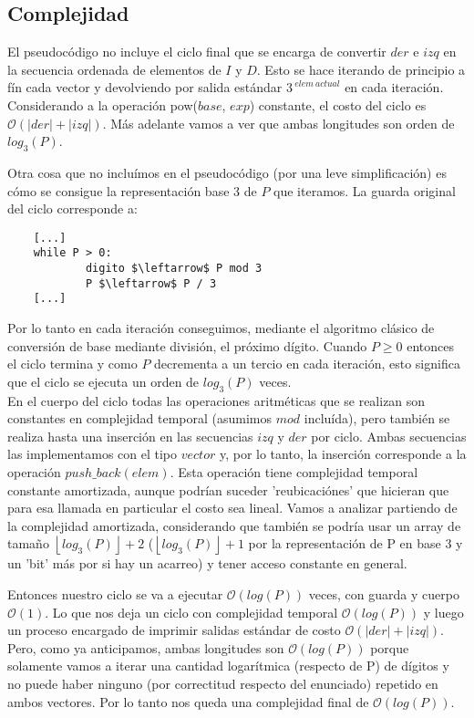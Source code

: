 \newpage
\subsection{Complejidad}
	El pseudocódigo no incluye el ciclo final que se encarga de convertir $der$ e $izq$ en la secuencia ordenada de elementos de $I$ y $D$. Esto se hace iterando de principio a fín cada vector y devolviendo por salida estándar $3^{\ elem \ actual}$ en cada iteración. Considerando a la operación pow($base$, $exp$) constante, el costo del ciclo es $\mathcal{O} (|der| + |izq|)$. Más adelante vamos a ver que ambas longitudes son orden de $log_3(P)$.
	
	Otra cosa que no incluímos en el pseudocódigo (por una leve simplificación) es cómo se consigue la representación base 3 de $P$ que iteramos. La guarda original del ciclo corresponde a:
	
	\begin{lstlisting}
	[...]
	while P > 0:
        	digito $\leftarrow$ P mod 3
        	P $\leftarrow$ P / 3
	[...]
	\end{lstlisting}
	
	Por lo tanto en cada iteración conseguimos, mediante el algoritmo clásico de conversión de base mediante división, el próximo dígito. Cuando $P \geq 0$ entonces el ciclo termina y como $P$ decrementa a un tercio en cada iteración, esto significa que el ciclo se ejecuta un orden de $log_3(P)$ veces. 
	\\
	
	En el cuerpo del ciclo todas las operaciones aritméticas que se realizan son constantes en complejidad temporal (asumimos $mod$ incluída), pero también se realiza hasta una inserción en las secuencias $izq$ y $der$ por ciclo. Ambas secuencias las implementamos con el tipo $vector$ y, por lo tanto, la inserción corresponde a la operación $push\_back(elem)$. Esta operación tiene complejidad temporal constante amortizada, aunque podrían suceder 'reubicaciónes' que hicieran que para esa llamada en particular el costo sea lineal. Vamos a analizar partiendo de la complejidad amortizada, considerando que también se podría usar un array de tamaño $\left \lfloor{log_3(P)}\right \rfloor + 2$ ($\left \lfloor{log_3(P)}\right \rfloor + 1$ por la representación de P en base 3 y un 'bit' más por si hay un acarreo) y tener acceso constante en general.
	
	Entonces nuestro ciclo se va a ejecutar $\mathcal{O} (log(P))$ veces, con guarda y cuerpo $\mathcal{O} (1)$. Lo que nos deja un ciclo con complejidad temporal $\mathcal{O} (log(P))$ y luego un proceso encargado de imprimir salidas estándar de costo $\mathcal{O} (|der| + |izq|)$. Pero, como ya anticipamos, ambas longitudes son $\mathcal{O} (log(P))$ porque solamente vamos a iterar una cantidad logarítmica (respecto de P) de dígitos y no puede haber ninguno (por correctitud respecto del enunciado) repetido en ambos vectores. Por lo tanto nos queda una complejidad final de $\mathcal{O} (log(P))$.
	\\
	
